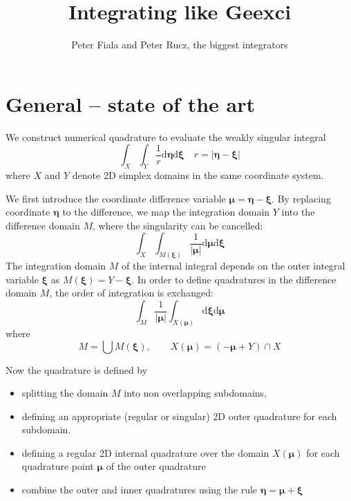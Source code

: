\documentclass{article}
\author{Peter Fiala and Peter Rucz, the biggest integrators}
\title{Integrating like Geexci}
\newcommand{\td}{\mathrm{d}}
\begin{document}
\maketitle

\section{General -- state of the art}

We construct numerical quadrature to evaluate the weakly singular integral
%
\begin{equation}
\int_X
\int_Y
\frac{1}{r}
\td \bm{\eta}
\td \bm{\xi}
\quad
r = |\bm{\eta}-\bm{\xi}|
\end{equation}
%
where $X$ and $Y$ denote 2D simplex domains in the same coordinate system.


We first introduce the coordinate difference variable $\bm{\mu} = \bm{\eta}-\bm{\xi}$.
By replacing coordinate $\bm{\eta}$ to the difference, we map the integration domain $Y$ into the difference domain $M$, where the singularity can be cancelled:
%
\begin{equation}
\int_X
\int_{M(\bm{\xi})}
\frac{1}{|\bm{\mu}|}
\td \bm{\mu}
\td \bm{\xi}
\end{equation}
%
The integration domain $M$ of the internal integral depends on the outer integral variable $\bm{\xi}$ as $M(\bm{\xi}) = Y - \bm{\xi}$. In order to define quadratures in the difference domain $M$, the order of integration is exchanged:
%
\begin{equation}
\int_{M}
\frac{1}{|\bm{\mu}|}
\int_{X(\bm{\mu})}
\td \bm{\xi}
\td \bm{\mu}
\end{equation}
%
where
%
\begin{equation}
M = \bigcup M(\bm{\xi}),
\qquad
X({\bm{\mu}}) = (-\bm{\mu} + Y) \cap X
\end{equation}

Now the quadrature is defined by
\begin{itemize}
	\item splitting the domain $M$ into non overlapping subdomains,
	\item defining an appropriate (regular or singular) 2D outer quadrature for each subdomain.
	\item defining a regular 2D internal quadrature over the domain $X(\bm{\mu})$ for each quadrature point $\bm{\mu}$ of the outer quadrature
	\item combine the outer and inner quadratures using the rule $\bm{\eta} = \bm{\mu} + \bm{\xi}$
\end{itemize}
\end{document}
